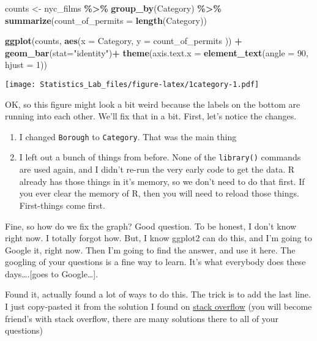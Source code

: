 \documentclass[
]{book}
\newenvironment{Shaded}{\begin{snugshade}}{\end{snugshade}}
\newcommand{\AttributeTok}[1]{\textcolor[rgb]{0.13,0.29,0.53}{#1}}
\newcommand{\DecValTok}[1]{\textcolor[rgb]{0.00,0.00,0.81}{#1}}
\newcommand{\FunctionTok}[1]{\textcolor[rgb]{0.13,0.29,0.53}{\textbf{#1}}}
\newcommand{\NormalTok}[1]{#1}
\newcommand{\OtherTok}[1]{\textcolor[rgb]{0.56,0.35,0.01}{#1}}
\newcommand{\SpecialCharTok}[1]{\textcolor[rgb]{0.81,0.36,0.00}{\textbf{#1}}}
\newcommand{\StringTok}[1]{\textcolor[rgb]{0.31,0.60,0.02}{#1}}
\begin{document}
\begin{Shaded}
\begin{Highlighting}[]
\NormalTok{counts }\OtherTok{\textless{}{-}}\NormalTok{ nyc\_films }\SpecialCharTok{\%\textgreater{}\%}
          \FunctionTok{group\_by}\NormalTok{(Category) }\SpecialCharTok{\%\textgreater{}\%}
          \FunctionTok{summarize}\NormalTok{(}\AttributeTok{count\_of\_permits =} \FunctionTok{length}\NormalTok{(Category))}

\FunctionTok{ggplot}\NormalTok{(counts, }\FunctionTok{aes}\NormalTok{(}\AttributeTok{x =}\NormalTok{ Category, }\AttributeTok{y =}\NormalTok{ count\_of\_permits )) }\SpecialCharTok{+}
  \FunctionTok{geom\_bar}\NormalTok{(}\AttributeTok{stat=}\StringTok{"identity"}\NormalTok{)}\SpecialCharTok{+} 
  \FunctionTok{theme}\NormalTok{(}\AttributeTok{axis.text.x =} \FunctionTok{element\_text}\NormalTok{(}\AttributeTok{angle =} \DecValTok{90}\NormalTok{, }\AttributeTok{hjust =} \DecValTok{1}\NormalTok{))}
\end{Highlighting}
\end{Shaded}

\texttt{[image: Statistics\_Lab\_files/figure-latex/1category-1.pdf]}

OK, so this figure might look a bit weird because the labels on the bottom are running into each other. We'll fix that in a bit. First, let's notice the changes.

\begin{enumerate}
\def\labelenumi{\arabic{enumi}.}
\item
  I changed \texttt{Borough} to \texttt{Category}. That was the main thing
\item
  I left out a bunch of things from before. None of the \texttt{library()} commands are used again, and I didn't re-run the very early code to get the data. R already has those things in it's memory, so we don't need to do that first. If you ever clear the memory of R, then you will need to reload those things. First-things come first.
\end{enumerate}

Fine, so how do we fix the graph? Good question. To be honest, I don't know right now. I totally forgot how. But, I know ggplot2 can do this, and I'm going to Google it, right now. Then I'm going to find the answer, and use it here. The googling of your questions is a fine way to learn. It's what everybody does these days\ldots.{[}goes to Google\ldots{]}.

Found it, actually found a lot of ways to do this. The trick is to add the last line. I just copy-pasted it from the solution I found on \href{https://stackoverflow.com/questions/1330989/rotating-and-spacing-axis-labels-in-ggplot2}{stack overflow} (you will become friend's with stack overflow, there are many solutions there to all of your questions)
\end{document}
